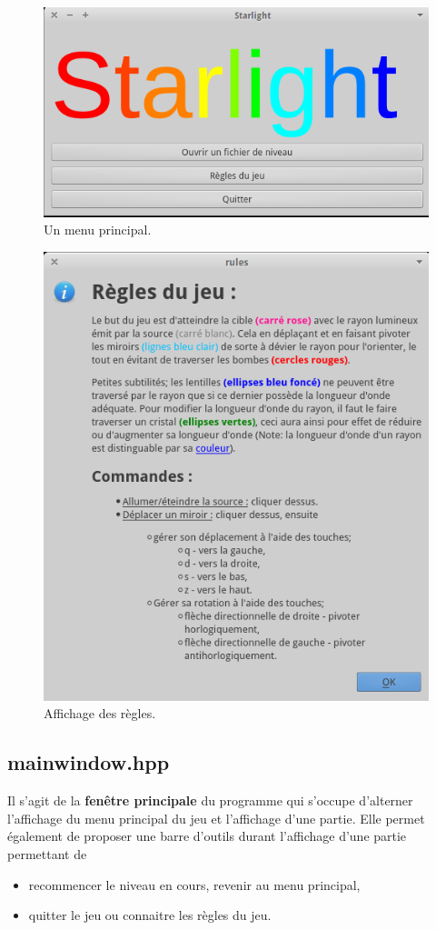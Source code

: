 \documentclass[a4paper,11pt]{report}
\begin{document}
\begin{figure}[h!]
	\caption{Un menu principal.}
	\centering
	\includegraphics[keepaspectratio=true,width=0.7\linewidth]{./screenshots/main_menu}
\end{figure}
\begin{figure}[h!]
	\caption{Affichage des règles.}
	\centering
	\includegraphics[keepaspectratio=true,width=0.5\linewidth]{./screenshots/rules}
\end{figure}

\subsection[La fenêtre principale]{mainwindow.hpp}

Il s'agit de la \textbf{fenêtre principale} du programme qui s'occupe d'alterner
l'affichage du menu principal du jeu et l'affichage d'une partie. Elle permet
également de proposer une barre d'outils durant l'affichage d'une partie
permettant de
\begin{itemize}
	\item recommencer le niveau en cours, revenir au menu principal,
	\item quitter le jeu ou connaitre les règles du jeu.
\end{itemize}
\end{document}
